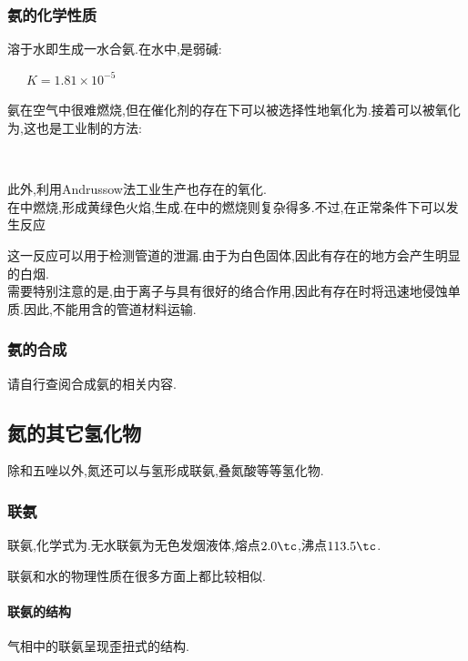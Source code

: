 \documentclass{ctexart}
\begin{document}
\subsubsection{氨的化学性质}
溶于水即生成一水合氨.在水中,是弱碱:
\begin{center}
    \ \ \ $K=1.81\times10^{-5}$
\end{center}

\indent 氨在空气中很难燃烧,但在催化剂的存在下可以被选择性地氧化为.接着可以被氧化为,这也是工业制的方法:
\begin{center}
    \\
\end{center}
此外,利用Andrussow法工业生产也存在的氧化.\\
\indent {}在中燃烧,形成黄绿色火焰,生成.在中的燃烧则复杂得多.不过,在正常条件下可以发生反应
\begin{center}
\end{center}
这一反应可以用于检测管道的泄漏.由于为白色固体,因此有存在的地方会产生明显的白烟.\\
\indent 需要特别注意的是,由于离子与具有很好的络合作用,因此有存在时将迅速地侵蚀单质.因此,不能用含的管道材料运输.
\subsubsection{氨的合成}
请自行查阅合成氨的相关内容.
\subsection{氮的其它氢化物}
除和五唑以外,氮还可以与氢形成联氨,叠氮酸等等氢化物.
\subsubsection{联氨}
\begin{substance}[\ce{N2H4}]
    联氨,化学式为.无水联氨为无色发烟液体,熔点$2.0\tc$,沸点$113.5\tc$.
\end{substance}
联氨和水的物理性质在很多方面上都比较相似.
\paragraph{联氨的结构}
气相中的联氨呈现歪扭式的结构.
\end{document}
